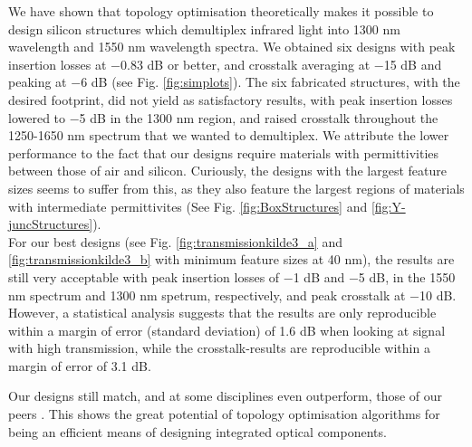We have shown that topology optimisation theoretically makes it possible to design silicon structures which demultiplex infrared light into 1300 nm wavelength and 1550 nm wavelength spectra. We obtained six designs with peak insertion losses at $-$0.83 dB or better, and crosstalk averaging at $-$15 dB and peaking at $-$6 dB (see Fig. \ref{fig:simplots}). 
The six fabricated structures, with the desired footprint, did not yield as satisfactory results, with peak insertion losses lowered to $-$5 dB in the 1300 nm region, and raised crosstalk throughout the 1250-1650 nm spectrum that we wanted to demultiplex. We attribute the lower performance to the fact that our designs require materials with permittivities between those of air and silicon. Curiously, the designs with the largest feature sizes seems to suffer from this, as they also feature the largest regions of materials with intermediate permittivites (See Fig. \ref{fig:BoxStructures} and \ref{fig:Y-juncStructures}).\\

For our best designs (see Fig. \ref{fig:transmissionkilde3_a} and \ref{fig:transmissionkilde3_b} with minimum feature sizes at 40 nm), the results are still very acceptable with peak insertion losses of $-$1 dB and $-$5 dB, in the 1550 nm spectrum and 1300 nm spetrum, respectively, and peak crosstalk at $-$10 dB. However, a statistical analysis suggests that the results are only reproducible within a margin of error (standard deviation) of 1.6 dB when looking at signal with high transmission, while the crosstalk-results are reproducible within a margin of error of 3.1 dB.

Our designs still match, and at some disciplines even outperform, those of our peers \cite{Stanford}. This shows the great potential of topology optimisation algorithms for being an efficient means of designing integrated optical components.

